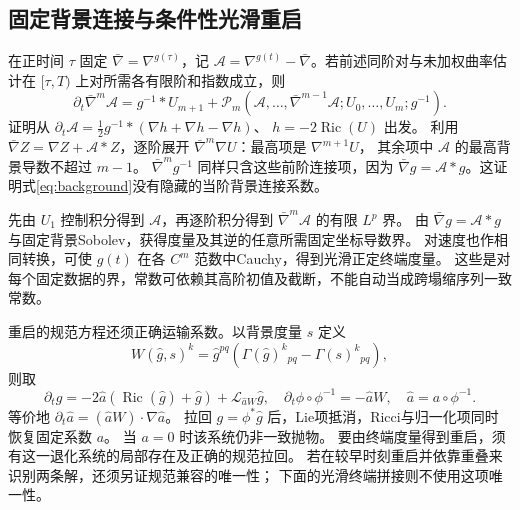 \documentclass[UTF8,a4paper,11pt,fontset=fandol]{ctexart}
\numberwithin{equation}{section}
\theoremstyle{definition}
\newcommand{\Ric}{\operatorname{Ric}}
\begin{document}
\subsection{固定背景连接与条件性光滑重启}
在正时间 $\tau$ 固定 $\bar\nabla=\nabla^{g(\tau)}$，记
$\mathscr A=\nabla^{g(t)}-\bar\nabla$。若前述同阶对与未加权曲率估计在
$[\tau,T)$ 上对所需各有限阶和指数成立，则
\begin{equation}\label{eq:background}
\partial_t\bar\nabla^m\mathscr A
=g^{-1}*U_{m+1}
+\mathcal P_m(\mathscr A,\ldots,\bar\nabla^{m-1}\mathscr A;
U_0,\ldots,U_m;g^{-1}).
\end{equation}
证明从
$\partial_t\mathscr A=\tfrac12g^{-1}*(\nabla h+\nabla h-\nabla h)$、
$h=-2\Ric(U)$ 出发。
利用 $\bar\nabla Z=\nabla Z+\mathscr A*Z$，逐阶展开
$\bar\nabla^m\nabla U$：最高项是 $\nabla^{m+1}U$，
其余项中 $\mathscr A$ 的最高背景导数不超过 $m-1$。
$\bar\nabla^mg^{-1}$ 同样只含这些前阶连接项，因为
$\bar\nabla g=\mathscr A*g$。这证明式\eqref{eq:background}没有隐藏的当阶背景连接系数。

先由 $U_1$ 控制积分得到 $\mathscr A$，再逐阶积分得到
$\bar\nabla^m\mathscr A$ 的有限 $L^p$ 界。
由 $\bar\nabla g=\mathscr A*g$ 与固定背景Sobolev，获得度量及其逆的任意所需固定坐标导数界。
对速度也作相同转换，可使 $g(t)$ 在各 $C^m$ 范数中Cauchy，得到光滑正定终端度量。
这些是对每个固定数据的界，常数可依赖其高阶初值及截断，不能自动当成跨塌缩序列一致常数。

重启的规范方程还须正确运输系数。以背景度量 $s$ 定义
\[
W(\widehat g,s)^k=\widehat g^{pq}
(\Gamma(\widehat g)^k{}_{pq}-\Gamma(s)^k{}_{pq}),
\]
则取
\[
\partial_t\widehat g
=-2\widehat a(\Ric(\widehat g)+\widehat g)
+\mathcal L_{\widehat aW}\widehat g,\quad
\partial_t\phi\circ\phi^{-1}=-\widehat aW,\quad
\widehat a=a\circ\phi^{-1}.
\]
等价地 $\partial_t\widehat a=(\widehat aW)\cdot\nabla\widehat a$。
拉回 $g=\phi^*\widehat g$ 后，Lie项抵消，Ricci与归一化项同时恢复固定系数 $a$。
当 $a=0$ 时该系统仍非一致抛物。
要由终端度量得到重启，须有这一退化系统的局部存在及正确的规范拉回。
若在较早时刻重启并依靠重叠来识别两条解，还须另证规范兼容的唯一性；
下面的光滑终端拼接则不使用这项唯一性。
\end{document}
